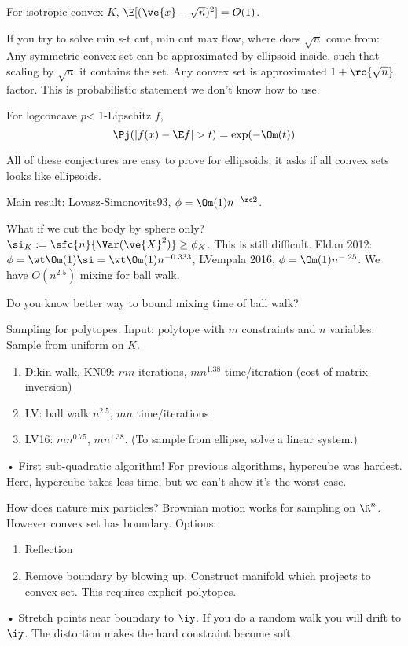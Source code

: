 \begin{conj}
For isotropic convex $K$, $\E[(\ve{x} - \sqrt n)^2] = O(1)$.
\end{conj}
If you try to solve min s-t cut, min cut max flow, where does $\sqrt n$ come from: Any symmetric convex set can be approximated by ellipsoid inside, such that scaling by $\sqrt n$ it contains the set. Any convex set is approximated $1+\rc{\sqrt n}$ factor. This is probabilistic statement we don't know how to use.
\begin{conj}
For logconcave $p$< 1-Lipschitz $f$,  
$$
\Pj(|f(x)-\E f|>t)=\exp(-\Om(t))
$$
\end{conj}
All of these conjectures are easy to prove for ellipsoids; it asks if all convex sets looks like ellipsoids.

Main result: Lovasz-Simonovits93, $\phi=\Om(1)n^{-\rc 2}$. 

What if we cut the body by sphere only? $\si_K := \sfc{n}{\Var(\ve{X}^2)}\ge \phi_K$. This is still difficult. Eldan 2012: $\phi=\wt\Om(1)\si = \wt\Om(1) n^{-0.333}$, LVempala 2016, $\phi=\Om(1) n^{-.25}$. We have $O(n^{2.5})$ mixing for ball walk.

Do you know better way to bound mixing time of ball walk?

Sampling for polytopes. Input: polytope with $m$ constraints and $n$ variables. Sample from uniform on $K$.
\begin{enumerate}
\item
Dikin walk, KN09: $mn$ iterations, $mn^{1.38}$ time/iteration (cost of matrix inversion)
\item
LV: ball walk $n^{2.5}$, $mn$ time/iterations
\item
LV16: $mn^{0.75}$, $mn^{1.38}$. (To sample from ellipse, solve a linear system.)
\end{enumerate}•
First sub-quadratic algorithm! For previous algorithms, hypercube was hardest. Here, hypercube takes less time, but we can't show it's the worst case.

How does nature mix particles? Brownian motion works for sampling on $\R^n$. However convex set has boundary. Options:
\begin{enumerate}
\item
Reflection
\item
Remove boundary by blowing up.  Construct manifold which projects to convex set.
This requires explicit polytopes. 
\end{enumerate}•
Stretch points near boundary to $\iy$. If you do a random walk you will drift to $\iy$. The distortion makes the hard constraint become soft.

